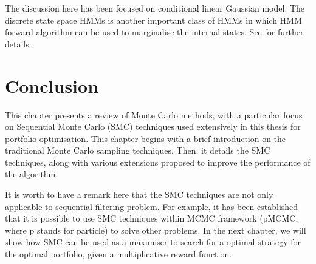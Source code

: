 The discussion here has been focused on conditional linear Gaussian model. The discrete state space HMMs is another important class of HMMs in which HMM forward algorithm \cite{LRR89} can be used to marginalise the internal states. See \cite{CO05} for further details.

\section{Conclusion}
This chapter presents a review of Monte Carlo methods, with a particular focus on Sequential Monte Carlo (SMC) techniques used extensively in this thesis for portfolio optimisation. This chapter begins with a brief introduction on the traditional Monte Carlo sampling techniques. Then, it details the SMC techniques, along with various extensions proposed to improve the performance of the algorithm.

It is worth to have a remark here that the SMC techniques are not only applicable to sequential filtering problem. For example, it has been established that it is possible to use SMC techniques within MCMC framework (pMCMC, where p stands for particle) \cite{CA10} to solve other problems. In the next chapter, we will show how SMC can be used as a maximiser to search for a optimal strategy for the optimal portfolio, given a multiplicative reward function.








\endinput
\section{Markov chain Monte Carlo (MCMC)}

Markov chain Monte Carlo (MCMC) are a set of algorithms that allows ones to draw random samples from the target probability distribution by constructing a ergotic Markov chain process which has its stationary distribution set to be target desired distribution. 

\subsection{Markov Chain}
Conceptually, Markov chain is a stochastic process in which the past and future states of the process are independent given the current state. A Markov chain can be viewed as an \emph{ordered} sequence of states $\{x_{1:N}\}$, in which state $x_t$ only depends on state $x_{t-1}$, i.e., the state at time $t$ is determined based on some trasition distribution of the form $p(x_t \mid x_{t-1})$, which is independent of all previous states $x_{t-2}, x_{t-3}, \ldots$. 

